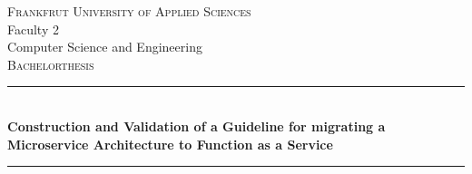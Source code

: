 \documentclass[a4paper,11pt, pagesize]{scrartcl}
\begin{document}
\begin{spacing}{1.2}
\begin{spacing}{1}
  \begin{titlepage}
	
    \begin{center}
      
      
      \textsc{\LARGE Frankfrut University of Applied Sciences}\\[1cm]
      
      {\large Faculty 2}\\
      Computer Science and Engineering \\[1.5cm]
      
      \textsc{\Large Bachelorthesis}\\[0.5cm]
      
      
      \begin{spacing}{1.7}
      \newcommand{\HRule}{\rule{\linewidth}{0.5mm}}
      \HRule \\[0.2cm]
      { \huge \bfseries Construction and Validation of a Guideline for migrating a Microservice Architecture to Function as a Service}\\[0.0cm]
      \HRule
      \end{spacing}
      
      \vfill
      
          
          


\end{center}
\end{titlepage}
\end{spacing}
\end{spacing}
\end{document}

